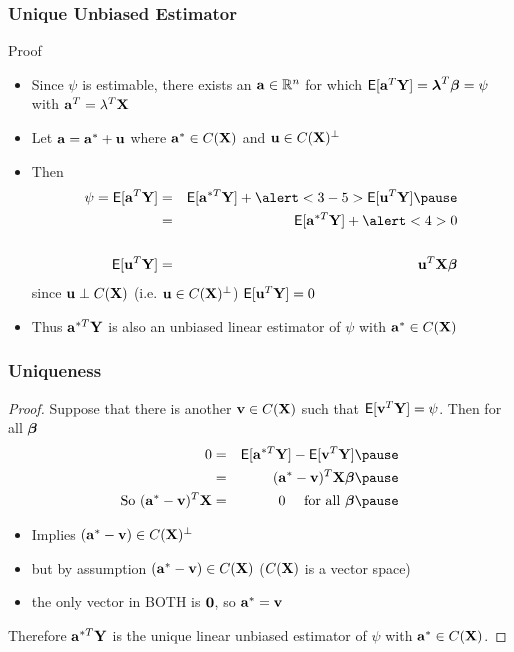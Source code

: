 \documentclass[handout]{beamer}
\begin{document}
  \begin{frame}
 \frametitle{Unique Unbiased Estimator}
  \begin{block}{Proof}
    \begin{itemize}
    \item     Since $\psi$ is estimable, there exists an $\mathbf{a} \in \mathbb{R}^n$ for
    which $\textsf{E}[\mathbf{a}^T\mathbf{Y}] = \boldsymbol{\lambda}^T\boldsymbol{\beta} = \psi$  with $\mathbf{a}^T =
    \lambda^T\mathbf{X}$ \pause
\item Let $\mathbf{a} = \mathbf{a}^* + \mathbf{u}$ where $\mathbf{a}^* \in C(\mathbf{X})$ and $\mathbf{u} \in
  C(\mathbf{X})^\perp$ \pause
\item Then
  \begin{eqnarray*}
\psi  =   \E[\a^T\Y] &=& \E[\a^{*T}\Y] + \alert<3-5>{\E[\u^T\Y]} \pause\\    
     & = & \E[\a^{*T} \Y] + \alert<4>{0} \\
  &  & \\
\E[\u^T\Y] & = & \u^T\X \b
  \end{eqnarray*} 
since $\mathbf{u} \perp C(\mathbf{X})$ (i.e. $\mathbf{u} \in C(\mathbf{X})^\perp$) $\textsf{E}[\mathbf{u}^T\mathbf{Y}] = 0$ \pause

\item Thus $\mathbf{a}^{*T} \mathbf{Y}$ is also an unbiased linear estimator of $\psi$ with
  $\mathbf{a}^* \in C(\mathbf{X})$
    \end{itemize}

  \end{block}
\end{frame}
\begin{frame}
  \frametitle{Uniqueness}
  \begin{proof}
  Suppose that there is another $\mathbf{v} \in C(\mathbf{X})$ such that $\textsf{E}[\mathbf{v}^T\mathbf{Y}] =
  \psi$. Then for all $\boldsymbol{\beta}$ \pause
  \begin{eqnarray*}
    0 & = & \E[\a^{*T}\Y] - \E[\v^T\Y]  \pause \\
      & = & (\a^* - \v)^T \X \b \pause\\
\text{So  } (\a^* - \v)^T\X & = &  0 \quad \text{ for all } \b \pause
  \end{eqnarray*}

\begin{itemize}
\item Implies $(\mathbf{a}^* - \mathbf{v}) \in C(\mathbf{X})^\perp$ \pause
\item but by assumption $(\mathbf{a}^* - \mathbf{v}) \in C(\mathbf{X})$ \pause ($C(\mathbf{X})$ is a
  vector space) \pause
\item the only vector in BOTH is $\mathbf{0}$, so $\mathbf{a}^* = \mathbf{v}$ \pause
\end{itemize}
Therefore $\mathbf{a}^{*T}\mathbf{Y}$ is the unique linear unbiased estimator of $\psi$
with $\mathbf{a}^* \in C(\mathbf{X})$.
  \end{proof}

\end{frame}
\end{document}
